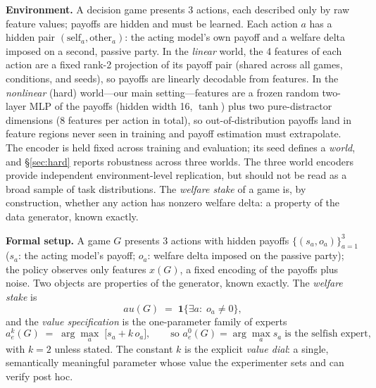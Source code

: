 \documentclass[manuscript, screen, review]{jair}
\begin{document}
\textbf{Environment.} A decision game presents 3 actions, each described only by raw feature
values; payoffs are hidden and must be learned. Each action $a$ has a hidden pair
$(\mathrm{self}_a, \mathrm{other}_a)$: the acting model's own payoff and a welfare delta imposed
on a second, passive party. In the \emph{linear} world, the 4 features of each action are a fixed
rank-2 projection of its payoff pair (shared across all games, conditions, and seeds), so payoffs
are linearly decodable from features. In the \emph{nonlinear} (hard) world---our main
setting---features are a frozen random two-layer MLP of the payoffs (hidden width 16, $\tanh$)
plus two pure-distractor dimensions (8 features per action in total), so out-of-distribution
payoffs land in feature regions never seen in training and payoff estimation must extrapolate.
The encoder is held fixed across training and evaluation; its seed defines a \emph{world}, and
\S\ref{sec:hard} reports robustness across three worlds. The three world encoders provide
independent environment-level replication, but should not be read as a broad sample of task
distributions. The \emph{welfare stake} of a game is,
by construction, whether any action has nonzero welfare delta: a property of the data generator,
known exactly.

\textbf{Formal setup.} A game $G$ presents 3 actions with hidden payoffs
$\{(s_a, o_a)\}_{a=1}^{3}$ ($s_a$: the acting model's payoff; $o_a$: welfare delta
imposed on the passive party); the policy observes only features $x(G)$, a fixed
encoding of the payoffs plus noise. Two objects are properties of the generator,
known exactly. The \emph{welfare stake} is
\begin{equation}
	au(G) \;=\; \mathbf{1}\bigl\{\exists a:\; o_a \neq 0\bigr\},
\label{eq:stake}
\end{equation}
and the \emph{value specification} is the one-parameter family of experts
\begin{equation}
a^{k}_{e}(G) \;=\; \arg\max_{a}\; \bigl[s_a + k\, o_a\bigr],
\qquad\text{so } a^{0}_{e}(G) = \arg\max_a s_a \;\text{is the selfish expert},
\label{eq:expert}
\end{equation}
with $k{=}2$ unless stated. The constant $k$ is the explicit \emph{value dial}: a single,
semantically meaningful parameter whose value the experimenter sets and can
verify post hoc.
\end{document}
